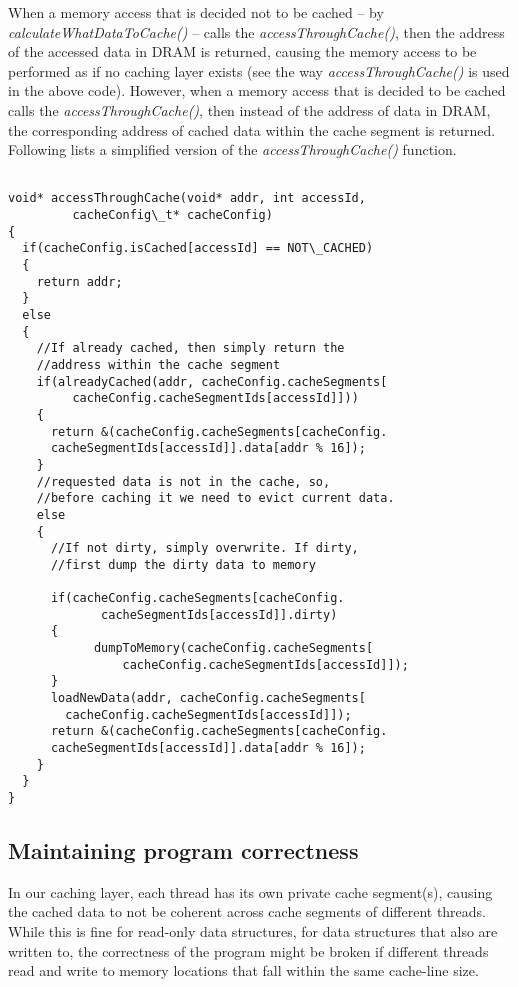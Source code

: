 When a memory access that is decided not to be cached -- by {\it calculateWhatDataToCache()} -- calls the {\it
accessThroughCache()}, then the address of the accessed data in DRAM is returned, causing the memory access to be
performed as if no caching layer exists (see the way {\it accessThroughCache()} is used in the above code). However,
when a memory access that is decided to be cached calls the {\it accessThroughCache()}, then instead of the address of
data in DRAM, the corresponding address of cached data within the cache segment is returned. Following lists a
simplified version of the {\it accessThroughCache()} function.


{\footnotesize

\begin{verbatim}

void* accessThroughCache(void* addr, int accessId, 
         cacheConfig\_t* cacheConfig)
{
  if(cacheConfig.isCached[accessId] == NOT\_CACHED)
  {
    return addr;
  }
  else
  {
    //If already cached, then simply return the 
    //address within the cache segment
    if(alreadyCached(addr, cacheConfig.cacheSegments[
         cacheConfig.cacheSegmentIds[accessId]]))
    {
      return &(cacheConfig.cacheSegments[cacheConfig.
      cacheSegmentIds[accessId]].data[addr % 16]);
    }
    //requested data is not in the cache, so, 
    //before caching it we need to evict current data.
    else 
    {
      //If not dirty, simply overwrite. If dirty, 
      //first dump the dirty data to memory

      if(cacheConfig.cacheSegments[cacheConfig.
             cacheSegmentIds[accessId]].dirty)
      {
	        dumpToMemory(cacheConfig.cacheSegments[
                cacheConfig.cacheSegmentIds[accessId]]);
      }
      loadNewData(addr, cacheConfig.cacheSegments[
        cacheConfig.cacheSegmentIds[accessId]]);
      return &(cacheConfig.cacheSegments[cacheConfig.
      cacheSegmentIds[accessId]].data[addr % 16]);
    }
  }
}
\end{verbatim}
}


\subsection{Maintaining program correctness}

In our caching layer, each thread has its own private cache segment(s), causing the cached data to not be coherent
across cache segments of different threads. While this is fine for read-only data structures, for data structures that
also are written to, the correctness of the program might be broken if different threads read and write to memory
locations that fall within the same cache-line size.

